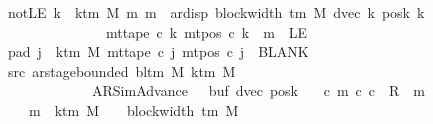 \begin{isabellebody}
\ \ \ \ \ \ \ notLE{\isacharcolon}{\kern0pt}\ {\isachardoublequoteopen}{\isasymforall}k\ {\isacharless}{\kern0pt}\ k{\isacharunderscore}{\kern0pt}tm\ M{\isachardot}{\kern0pt}\ {\isasymforall}m{\isachardot}{\kern0pt}\ m\ {\isacharless}{\kern0pt}\ ar{\isacharunderscore}{\kern0pt}disp\ {\isacharparenleft}{\kern0pt}block{\isacharunderscore}{\kern0pt}width\ {\isacharparenleft}{\kern0pt}{\isasymGamma}{\isacharunderscore}{\kern0pt}tm\ M{\isacharparenright}{\kern0pt}{\isacharparenright}{\kern0pt}\ {\isacharparenleft}{\kern0pt}dvec\ k{\isacharparenright}{\kern0pt}\ {\isacharparenleft}{\kern0pt}posk{}\ k{\isacharparenright}{\kern0pt}\isanewline
\ \ \ \ \ \ \ \ \ \ \ \ \ \ \ \ \ \ \ \ {\isasymlongrightarrow}\ mt{\isacharunderscore}{\kern0pt}tape\ c{}\ k\ {\isacharparenleft}{\kern0pt}mt{\isacharunderscore}{\kern0pt}pos\ c{}\ k\ {\isacharminus}{\kern0pt}\ m{\isacharparenright}{\kern0pt}\ {\isasymnoteq}\ LE{}{\isachardoublequoteclose}\isanewline
\ \ \ \ \ \ \ pad{}{\isacharcolon}{\kern0pt}\ {\isachardoublequoteopen}{\isasymforall}j\ {\isasymge}\ k{\isacharunderscore}{\kern0pt}tm\ M{\isachardot}{\kern0pt}\ mt{\isacharunderscore}{\kern0pt}tape\ c{}\ j\ {\isacharparenleft}{\kern0pt}mt{\isacharunderscore}{\kern0pt}pos\ c{}\ j{\isacharparenright}{\kern0pt}\ {\isacharequal}{\kern0pt}\ BLANK{}{\isachardoublequoteclose}\isanewline
\ \ \ \ \ \ \ src{}{\isacharcolon}{\kern0pt}\ {\isachardoublequoteopen}ar{\isacharunderscore}{\kern0pt}stage{\isacharunderscore}{\kern0pt}bounded\ {\isacharparenleft}{\kern0pt}bl{\isacharunderscore}{\kern0pt}tm\ M{\isacharparenright}{\kern0pt}\ {\isacharparenleft}{\kern0pt}k{\isacharunderscore}{\kern0pt}tm\ M{\isacharparenright}{\kern0pt}\isanewline
\ \ \ \ \ \ \ \ \ \ \ \ \ \ \ \ \ \ \ {\isacharparenleft}{\kern0pt}AR{\isacharunderscore}{\kern0pt}SimAdvance{\isacharcomma}{\kern0pt}\ {}{\isacharcomma}{\kern0pt}\ {}{\isacharcomma}{\kern0pt}\ buf{}{\isacharcomma}{\kern0pt}\ dvec{\isacharcomma}{\kern0pt}\ posk{}{\isacharparenright}{\kern0pt}{\isachardoublequoteclose}\isanewline
\ \ \ {\isachardoublequoteopen}{\isasymexists}c\ m{\isachardot}{\kern0pt}\ {\isacharparenleft}{\kern0pt}c{}{\isacharcomma}{\kern0pt}\ c{\isacharparenright}{\kern0pt}\ {\isasymin}\ R{\isacharprime}{\kern0pt}\ {\isacharcircum}{\kern0pt}{\isacharcircum}{\kern0pt}\ m\isanewline
\ \ \ \ \ \ \ \ \ {\isasymand}\ m\ {\isasymle}\ k{\isacharunderscore}{\kern0pt}tm\ M\ {\isacharasterisk}{\kern0pt}\ {\isacharparenleft}{\kern0pt}{}\ {\isacharasterisk}{\kern0pt}\ block{\isacharunderscore}{\kern0pt}width\ {\isacharparenleft}{\kern0pt}{\isasymGamma}{\isacharunderscore}{\kern0pt}tm\ M{\isacharparenright}{\kern0pt}{\isacharparenright}{\kern0pt}\isanewline

\end{isabellebody}
